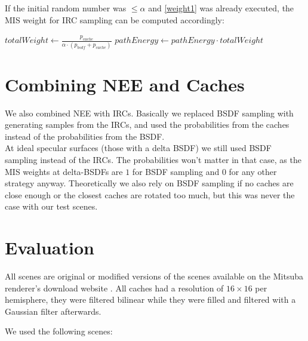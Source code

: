 If the initial random number was $\leq \alpha$ and \ref{weight1} was already executed, the MIS weight for IRC sampling can be computed accordingly:\newline %

\begin{algorithmic}
\State $totalWeight \gets \frac{p_{cache}}{\alpha \cdot (p_{bsdf}+p_{cache})}$
\State $pathEnergy \gets pathEnergy \cdot totalWeight$
\end{algorithmic}

\section{Combining NEE and Caches}

We also combined NEE with IRCs. Basically we replaced BSDF sampling with generating samples from the IRCs, and used the probabilities from the caches instead of the probabilities from the BSDF.\\
At ideal specular surfaces (those with a delta BSDF) we still used BSDF sampling instead of the IRCs. The probabilities won't matter in that case, as the MIS weights at delta-BSDFs are $1$ for BSDF sampling and $0$ for any other strategy anyway. Theoretically we also rely on BSDF sampling if no caches are close enough or the closest caches are rotated too much, but this was never the case with our test scenes.












\section{Evaluation}
All scenes are original or modified versions of the scenes available on the Mitsuba renderer's download website \cite{mitsuba}. All caches had a resolution of $16\times 16$ per hemisphere, they were filtered bilinear while they were filled and filtered with a Gaussian filter afterwards.

We used the following scenes:


